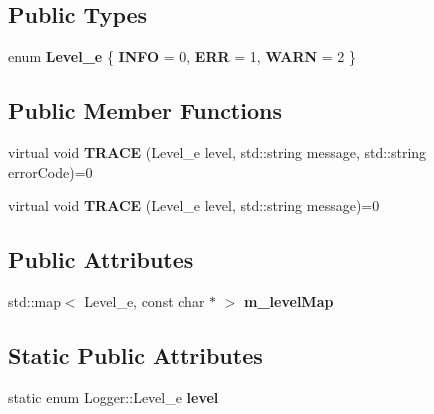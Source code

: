 \subsection*{Public Types}
\begin{DoxyCompactItemize}
\item 
\mbox{\label{classLogger_aa1875ace78bce45b33f84d7f5de7790d}} 
enum {\bfseries Level\+\_\+e} \{ {\bfseries I\+N\+FO} = 0, 
{\bfseries E\+RR} = 1, 
{\bfseries W\+A\+RN} = 2
 \}
\end{DoxyCompactItemize}
\subsection*{Public Member Functions}
\begin{DoxyCompactItemize}
\item 
\mbox{\label{classLogger_a60f8d2a66d45b0ae89aeb59186bb6c0a}} 
virtual void {\bfseries T\+R\+A\+CE} (Level\+\_\+e level, std\+::string message, std\+::string error\+Code)=0
\item 
\mbox{\label{classLogger_acff1531ccd76c30d960e600eac3de005}} 
virtual void {\bfseries T\+R\+A\+CE} (Level\+\_\+e level, std\+::string message)=0
\end{DoxyCompactItemize}
\subsection*{Public Attributes}
\begin{DoxyCompactItemize}
\item 
\mbox{\label{classLogger_a5e3acb7eae07a5cee57d28711ce45413}} 
std\+::map$<$ Level\+\_\+e, const char $\ast$ $>$ {\bfseries m\+\_\+level\+Map}
\end{DoxyCompactItemize}
\subsection*{Static Public Attributes}
\begin{DoxyCompactItemize}
\item 
\mbox{\label{classLogger_ade70cee1c967259b5dc2448424c7df68}} 
static enum Logger\+::\+Level\+\_\+e {\bfseries level}
\end{DoxyCompactItemize}
